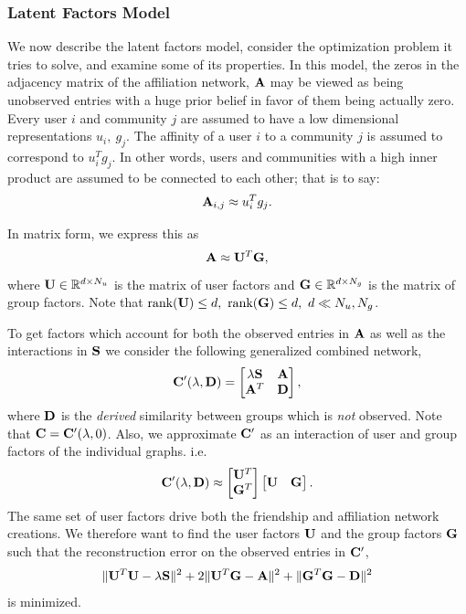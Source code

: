 \documentclass{sig-alternate}
\begin{document}
\subsubsection{Latent Factors Model}
\label{Latent Factors Model}
We now describe the latent factors model, consider the optimization problem it tries to solve, and examine some of its properties. In this model, the zeros in the adjacency matrix of the affiliation network, $\mathbf{A}$ may be viewed as being unobserved entries with a huge prior belief in favor of them being actually zero. Every user $i$ and community $j$ are assumed to have a low dimensional representations $u_i,\ g_j$. The affinity of a user $i$ to a community $j$ is assumed to correspond to $u_i^{T} g_j$. In other words, users and communities with a high inner product are assumed to be connected to each other; that is to say: $$\mathbf{A}_{i, j} \approx u_i^T g_j.$$

In matrix form, we express this as
$$\mathbf{A} \approx \mathbf{U}^T \mathbf{G},$$
where $\mathbf{U} \in \mathbb{R}^{d \times N_u}$ is the matrix of user factors and $\mathbf{G} \in \mathbb{R}^{d \times N_g}$ is the matrix of group factors. Note that $\text{rank}(\mathbf{U}) \leq d,\ \text{rank}(\mathbf{G}) \leq d,\ d \ll N_u, N_g$.

To get factors which account for both the observed entries in $\mathbf{A}$ as well as the interactions in $\mathbf{S}$ we consider the following generalized combined network,
\begin{equation}
\mathbf{C}'(\lambda, \mathbf{D}) =
\begin{bmatrix}
\lambda \mathbf{S} & \mathbf{A} \\
\mathbf{A}^T & \mathbf{D}
\end{bmatrix},
\label{e:generalizedCombined}
\end{equation}
where $\mathbf{D}$ is the \emph{derived} similarity between groups which is \emph{not} observed. Note that $\mathbf{C} = \mathbf{C}'(\lambda, 0)$. Also, we approximate $\mathbf{C}'$ as an interaction of user and group factors of the individual graphs. i.e.
\[\mathbf{C}'(\lambda, \mathbf{D}) \approx
\begin{bmatrix}
\mathbf{U}^T \\
\mathbf{G}^T
\end{bmatrix}
\begin{bmatrix}
\mathbf{U} & \mathbf{G}
\end{bmatrix}.
\]
The same set of user factors drive both the friendship and affiliation network creations. We therefore want to find the user factors $\mathbf{U}$ and the group factors $\mathbf{G}$ such that the reconstruction error on the observed entries in $\mathbf{C}'$,
\begin{equation}
\|\mathbf{U}^T \mathbf{U} -\lambda \mathbf{S} \|^2 + 2\|\mathbf{U}^T \mathbf{G} -\mathbf{A} \|^2 + \|\mathbf{G}^T\mathbf{G} - \mathbf{D}\|^2
\label{e:objective}
\end{equation}
is minimized.
\end{document}
